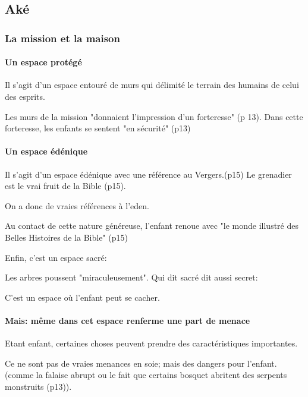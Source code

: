 \documentclass[a4paper, 11pt, hidelinks]{article}
\newcommand{\bs}{\bigskip}
\begin{document}
\subsection{Aké}


\subsubsection{La mission et la maison}


\paragraph{Un espace protégé}


Il s'agit d'un espace entouré de murs qui délimité le terrain des humains de celui des esprits.


Les murs de la mission "donnaient l'impression d'un forteresse" (p 13).
Dans cette forteresse, les enfants se sentent "en sécurité" (p13)



\paragraph{Un espace édénique}


Il s'agit d'un espace édénique avec une référence au Vergers.(p15) Le grenadier est le vrai fruit de la Bible (p15).

On a donc de vraies références à l'eden.

Au contact de cette nature généreuse, l'enfant renoue avec "le monde illustré des Belles Histoires de la Bible" (p15)

\bs

Enfin, c'est un espace sacré:

Les arbres poussent "miraculeusement". Qui dit sacré dit aussi secret:

C'est un espace où l'enfant peut se cacher.



\paragraph{Mais: même dans cet espace renferme une part de menace}

Etant enfant, certaines choses peuvent prendre des caractéristiques importantes.

Ce ne sont pas de vraies menances en soie; mais des dangers pour l'enfant. (comme la falaise abrupt ou 
le fait que certains bosquet abritent des serpents monstruits (p13)).
\end{document}
